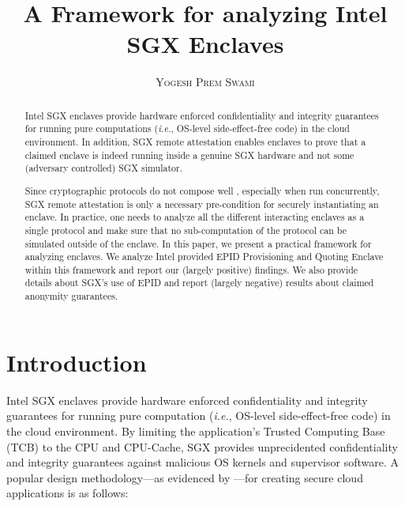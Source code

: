 \documentclass[10pt]{article}
\title{\bf A Framework for analyzing Intel SGX Enclaves}
\author{\textsc{Yogesh Prem Swami}}
\date{\lastupdate}
\newcommand{\ie}{\textit{i.e.}}
\begin{document}

\maketitle

\begin{abstract}
  Intel SGX enclaves  provide hardware
  enforced confidentiality and integrity guarantees for running pure
  computations (\ie, OS-level side-effect-free code) in the cloud
  environment. In addition, SGX remote attestation enables
  enclaves to prove that a claimed enclave is indeed running inside a
  genuine SGX hardware and not some (adversary controlled) SGX
  simulator.

  Since cryptographic protocols do not compose well \cite{ucframework}, 
  especially when run concurrently, SGX remote attestation is only a 
  necessary pre-condition for securely instantiating an enclave. In 
  practice, one needs to analyze all the different interacting enclaves 
  as a single protocol and make sure that no sub-computation of the 
  protocol can be simulated outside of the enclave. In this paper, 
  we present a practical framework for analyzing enclaves. We analyze 
  Intel provided EPID\cite{epid} \textsf{Provisioning} and \textsf{Quoting} 
  Enclave\cite{sgxattest} within this framework and report our (largely 
  positive) findings. We also provide details about SGX's use of EPID 
  and report (largely negative) results about claimed anonymity guarantees.
  
\end{abstract}

\section{Introduction}
\label{sec:intro}
  Intel SGX enclaves\cite{sgxinnov, sgxinnov2} provide hardware
  enforced confidentiality and  integrity guarantees for running pure
  computation (\textit{i.e.}, OS-level side-effect-free code) in the
  cloud environment. By limiting the application's Trusted Computing
  Base (TCB) to the CPU and CPU-Cache, SGX provides unprecidented
  confidentiality and integrity guarantees against malicious OS
  kernels and supervisor software. A popular design methodology---as 
  evidenced by \cite{Haven, Graphene, Scone}---for creating secure 
  cloud applications is as follows:
\end{document}
